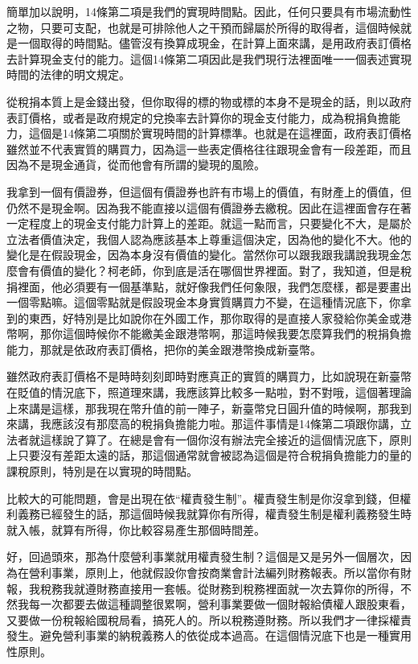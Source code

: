 \documentclass[oneside,sub3section]{ctexbook}
\begin{document}
簡單加以說明，14條第二項是我們的實現時間點。因此，任何只要具有市場流動性之物，只要可支配，也就是可排除他人之干預而歸屬於所得的取得者，這個時候就是一個取得的時間點。儘管沒有換算成現金，在計算上面來講，是用政府表訂價格去計算現金支付的能力。這個14條第二項因此是我們現行法裡面唯一一個表述實現時間的法律的明文規定。

從稅捐本質上是金錢出發，但你取得的標的物或標的本身不是現金的話，則以政府表訂價格，或者是政府規定的兌換率去計算你的現金支付能力，成為稅捐負擔能力，這個是14條第二項關於實現時間的計算標準。也就是在這裡面，政府表訂價格雖然並不代表實質的購買力，因為這一些表定價格往往跟現金會有一段差距，而且因為不是現金通貨，從而他會有所謂的變現的風險。

我拿到一個有價證券，但這個有價證券也許有市場上的價值，有財產上的價值，但仍然不是現金啊。因為我不能直接以這個有價證券去繳稅。因此在這裡面會存在著一定程度上的現金支付能力計算上的差距。就這一點而言，只要變化不大，是屬於立法者價值決定，我個人認為應該基本上尊重這個決定，因為他的變化不大。他的變化是在假設現金，因為本身沒有價值的變化。當然你可以跟我跟我講說我現金怎麼會有價值的變化？柯老師，你到底是活在哪個世界裡面。對了，我知道，但是稅捐裡面，他必須要有一個基準點，就好像我們任何象限，我們怎麼樣，都是要畫出一個零點嘛。這個零點就是假設現金本身實質購買力不變，在這種情況底下，你拿到的東西，好特別是比如說你在外國工作，那你取得的是直接人家發給你美金或港幣啊，那你這個時候你不能繳美金跟港幣啊，那這時候我要怎麼算我們的稅捐負擔能力，那就是依政府表訂價格，把你的美金跟港幣換成新臺幣。

雖然政府表訂價格不是時時刻刻即時對應真正的實質的購買力，比如說現在新臺幣在貶值的情況底下，照道理來講，我應該算比較多一點啦，對不對哦，這個著理論上來講是這樣，那我現在幣升值的前一陣子，新臺幣兌日圓升值的時候啊，那我到來講，我應該沒有那麼高的稅捐負擔能力啦。那這件事情是14條第二項跟你講，立法者就這樣說了算了。在總是會有一個你沒有辦法完全接近的這個情況底下，原則上只要沒有差距太遠的話，那這個通常就會被認為這個是符合稅捐負擔能力的量的課稅原則，特別是在以實現的時間點。

比較大的可能問題，會是出現在依``權責發生制''。權責發生制是你沒拿到錢，但權利義務已經發生的話，那這個時候我就算你有所得，權責發生制是權利義務發生時就入帳，就算有所得，你比較容易產生那個時間差。

好，回過頭來，那為什麼營利事業就用權責發生制？這個是又是另外一個層次，因為在營利事業，原則上，他就假設你會按商業會計法編列財務報表。所以當你有財報，我稅務我就遵財務直接用一套帳。從財務到稅務裡面就一次去算你的所得，不然我每一次都要去做這種調整很累啊，營利事業要做一個財報給債權人跟股東看，又要做一份稅報給國稅局看，搞死人的。所以稅務遵財務。所以我們才一律採權責發生。避免營利事業的納稅義務人的依從成本過高。在這個情況底下也是一種實用性原則。
\end{document}
